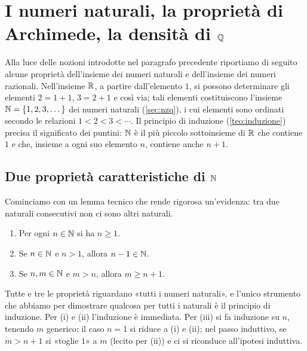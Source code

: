 \section{I numeri naturali, la proprietà di Archimede, la densità di \texorpdfstring{$\mathbb{Q}$}{Q}}
\label{sec:archimede}

Alla luce delle nozioni introdotte nel paragrafo precedente riportiamo di seguito alcune
proprietà dell'insieme dei numeri naturali e dell'insieme dei numeri razionali. Nell'insieme
$\mathbb{R}$, a partire dall'elemento $1$, si possono determinare gli elementi $2=1+1$, $3=2+1$ e
così via; tali elementi costituiscono l'insieme $\mathbb{N}=\{1,2,3,\dots\}$ dei numeri naturali
(\cref{sec:nzq}), i cui elementi sono ordinati secondo le relazioni $1<2<3<\cdots$. Il
principio di induzione (\cref{teo:induzione}) precisa il significato dei puntini: $\N$ è
il più piccolo sottoinsieme di $\mathbb{R}$ che contiene $1$ e che, insieme a ogni suo elemento
$n$, contiene anche $n+1$.

\subsection{Due proprietà caratteristiche di \texorpdfstring{$\N$}{N}}

Cominciamo con un lemma tecnico che rende rigorosa un'evidenza: tra due naturali
consecutivi non ci sono altri naturali.

\begin{lemma}[Struttura di $\N$]\label{lem:struttura-N}
\leavevmode
\begin{enumerate}
  \item Per ogni $n\in\mathbb{N}$ si ha $n\ge1$.
  \item Se $n\in\mathbb{N}$ e $n>1$, allora $n-1\in\mathbb{N}$.
  \item Se $n,m\in\mathbb{N}$ e $m>n$, allora $m\ge n+1$.
\end{enumerate}
\end{lemma}

\begin{schema}
\end{schema}

\begin{strategia}
Tutte e tre le proprietà riguardano «tutti i numeri naturali», e l'unico strumento che
abbiamo per dimostrare qualcosa per tutti i naturali è il principio di induzione. Per
(i) e (ii) l'induzione è immediata. Per (iii) si fa induzione su $n$, tenendo $m$
generico: il caso $n=1$ si riduce a (i) e (ii); nel passo induttivo, se $m>n+1$ si
«toglie $1$» a $m$ (lecito per (ii)) e ci si riconduce all'ipotesi induttiva.
\end{strategia}


